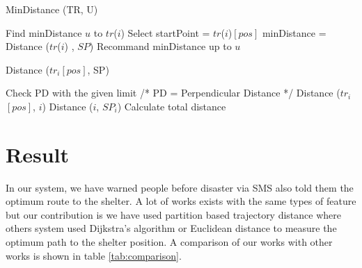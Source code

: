\documentclass[conference]{IEEEtran}
\begin{document}


\begin{algorithm}
\caption{MinDistance (TR, U)}
\label{alg:mindistance}
\begin{algorithmic}[1]
\State Find minDistance $u$ to $tr$($i$)
\State Select startPoint = $tr$($i$)$[pos]$
\State minDistance = Distance ($tr$($i$) , $SP$)
\EndFor
\EndFor
\State Recommand minDistance up to $u$
\end{algorithmic}
\end{algorithm}



\begin{algorithm}
\caption{Distance ($tr_i$$[pos]$, SP)}
\label{alg:distance}
\begin{algorithmic}[1]
\State Check PD with the given limit /* PD = Perpendicular Distance */ 
\State Distance ($tr_i$$[pos]$, $i$)
\State Distance ($i$, $SP_i$)
\EndFor
\State Calculate total distance
\EndFor
\end{algorithmic}
\end{algorithm}




\section {Result}
\label{result}

In our system, we have warned people before disaster via SMS also told them the optimum route to the shelter. A lot of works exists with the same types of feature but our contribution is we have used partition based trajectory distance where others system used Dijkstra's algorithm or Euclidean distance to measure the optimum path to the shelter position. A comparison of our works with other works is shown in table \ref{tab:comparison}.
\end{document}
